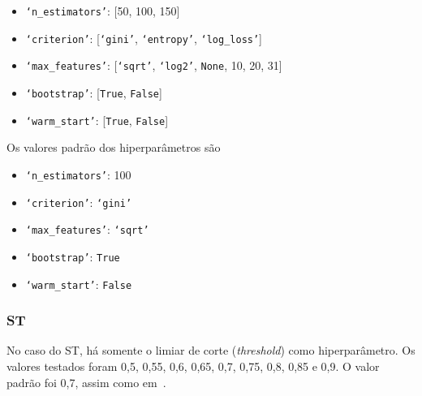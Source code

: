 \begin{itemize}
    \item \texttt{`n\_estimators'}: [50, 100, 150]
    \item \texttt{`criterion'}: [\texttt{`gini'}, \texttt{`entropy'}, \texttt{`log\_loss'}]
    \item \texttt{`max\_features'}: [\texttt{`sqrt'}, \texttt{`log2'}, \texttt{None}, 10, 20, 31]
    \item \texttt{`bootstrap'}: [\texttt{True}, \texttt{False}]
    \item \texttt{`warm\_start'}: [\texttt{True}, \texttt{False}]
\end{itemize}

Os valores padrão dos hiperparâmetros são

\begin{itemize}
    \item \texttt{`n\_estimators'}: 100
    \item \texttt{`criterion'}: \texttt{`gini'}
    \item \texttt{`max\_features'}: \texttt{`sqrt'}
    \item \texttt{`bootstrap'}: \texttt{True}
    \item \texttt{`warm\_start'}: \texttt{False}
\end{itemize}


\subsubsection{ST}\label{subsubsec:st_hps}

No caso do ST, há somente o limiar de corte (\textit{threshold}) como hiperparâmetro. Os valores testados foram 0,5, 0,55, 0,6, 0,65, 0,7, 0,75, 0,8, 0,85 e 0,9. O valor padrão foi 0,7, assim como em~\cite{MagalhaesStatistical}.
